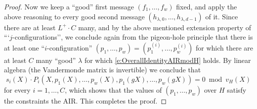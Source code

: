 \documentclass[11pt,article,oneside]{memoir}
\theoremstyle{definition}
\theoremstyle{remark}
\begin{document}
\begin{proof}
Now we keep a ``good'' first message $(f_1,\ldots, f_w)$ fixed, and apply the above reasoning to every good second message $(h_{\lambda,0},\ldots, h_{\lambda, d-1})$ of it. 
Since there are at least $L^+\cdot C$ many, and by the above mentioned extension property of ```$j$-configurations'', we conclude again from the pigeon-hole principle that there is at least one ``$i$-configuration'' $(p_1,\ldots, p_w) = (p_1^{(i)}, \ldots,p_w^{(i)})$ for which there are at least $C$ many “good” $\lambda$ for which \eqref{e:OverallIdentityAIRmodH} holds.
By linear algebra (the Vandermonde matrix is invertible) we conclude that  
\[
s_i(X)\cdot P_i(X, p_1(X), \ldots, p_w(X), p_1(gX), \ldots, p_w(g X)) = 0 \bmod v_H(X)
\]
for every $i =1, \ldots, C$, which shows that the values of $(p_1,\ldots, p_w)$ over $H$ satisfy the constraints the AIR.
This completes the proof.
%
%

\end{proof}
\end{document}
